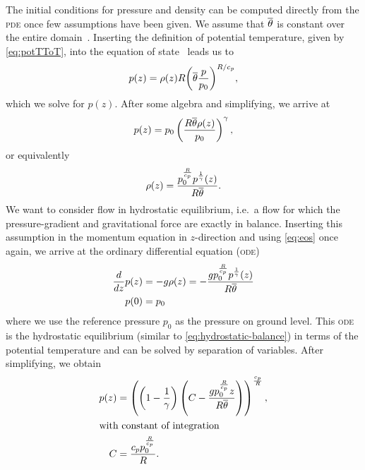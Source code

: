 The initial conditions for pressure and density can be computed directly from the \textsc{pde} once few assumptions have been given.
We assume that $\overline{\theta}$ is constant over the entire domain~\cite{giraldo2008study}.
Inserting the definition of potential temperature, given by \cref{eq:potTToT}, into the equation of state~ leads us to
\begin{equation}
  p(z) = \rho(z) R {\left( \overline{\theta} \frac{p}{p_0}\right)}^{R/c_p},
\end{equation}
which we solve for $p(z)$.
After some algebra and simplifying, we arrive at
\begin{equation}
 p(z) = p_0 \left( \frac{R \overline{\theta} \rho(z)}{p_0} \right)^{\gamma},
\end{equation}
or equivalently
\begin{equation}
  \label{eq:eos-potT}
\rho(z) = \frac{p_{0}^{\frac{R}{c_{p}}} p^{\frac{1}{\gamma}}{\left (z \right )}}{R \overline{\theta}}.
\end{equation}
We want to consider flow in hydrostatic equilibrium, i.e.\ a flow for which the pressure-gradient and gravitational force are exactly in balance.
Inserting this assumption in the momentum equation in $z$-direction and using \cref{eq:eos} once again, we arrive at the ordinary differential equation (\textsc{ode})
\begin{align}
  \label{eq:hydrostatic-balance-potT}
  \begin{split}
  \frac{d}{d z} p{\left (z \right )} &= -g \rho(z)
                                     = 
        - \frac{g p_{0}^{\frac{R}{c_{p}}} p^{\frac{1}{\gamma}}{\left (z \right )}}{R \overline{\theta}}\\
  p{\left (0 \right )} &= p_0
  \end{split}
\end{align}
where we use the reference pressure $p_0$ as the pressure on ground level.
This \textsc{ode} is the hydrostatic equilibrium (similar to \cref{eq:hydrostatic-balance}) in terms of the potential temperature and can be solved by separation of variables.
After simplifying, we obtain
\begin{align}
  \label{eq:hydrostatic-background-pressure}
p(z) &= \left(\left(1 - \frac{1}{\gamma}\right) \left(C - \frac{g p_{0}^{\frac{R}{c_{p}}} z}{R \overline{\theta}}\right)\right)^{\frac{c_{p}}{R}},\\
\shortintertext{with constant of integration}
 C &= \frac{c_{p} p_{0}^{\frac{R}{c_{p}}}}{R}.
\end{align}

